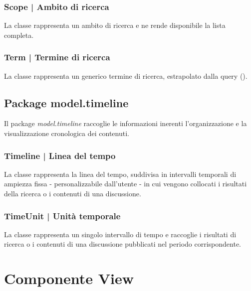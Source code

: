 \documentclass[10pt,a4paper,headinclude,footinclude,hidelinks]{scrreprt} %
\begin{document}
	\subsection[Scope]{Scope | Ambito di ricerca}
	\label{sec:stage:design:model.search:search-scope}
	La classe \textit{} rappresenta un ambito di ricerca e ne rende disponibile la lista completa.

	\subsection[Term]{Term | Termine di ricerca}
	\label{sec:stage:design:model.search:search-term}
	La classe \textit{} rappresenta un generico termine di ricerca, estrapolato dalla query (\textit{}).

	\section{Package model.timeline}
	\label{sec:stage:design:model.timeline}
	Il package \textit{model.timeline} raccoglie le informazioni inerenti l'organizzazione e la visualizzazione cronologica dei contenuti.

	\subsection[Timeline]{Timeline | Linea del tempo}
	\label{sec:stage:design:model.timeline:timeline}
	La classe \textit{} rappresenta la linea del tempo, suddivisa in intervalli temporali \textit{} di ampiezza fissa - personalizzabile dall'utente - in cui vengono collocati i risultati della ricerca o i contenuti di una discussione.

	\subsection[TimeUnit]{TimeUnit | Unità temporale}
	\label{sec:stage:design:model.timeline:time-unit}
	La classe \textit{} rappresenta un singolo intervallo di tempo e raccoglie i risultati di ricerca o i contenuti di una discussione pubblicati nel periodo corrispondente.

	\chapter{Componente View}
	\label{ch:stage:design:view}
\end{document}

